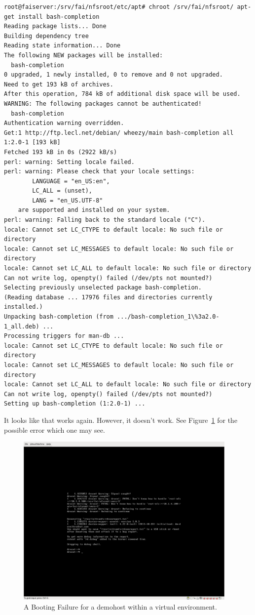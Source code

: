 \documentclass[11pt
  , a4paper
  , article
  , oneside
]{memoir}
\begin{document}
\begin{lstlisting}
root@faiserver:/srv/fai/nfsroot/etc/apt# chroot /srv/fai/nfsroot/ apt-get install bash-completion
Reading package lists... Done
Building dependency tree       
Reading state information... Done
The following NEW packages will be installed:
  bash-completion
0 upgraded, 1 newly installed, 0 to remove and 0 not upgraded.
Need to get 193 kB of archives.
After this operation, 784 kB of additional disk space will be used.
WARNING: The following packages cannot be authenticated!
  bash-completion
Authentication warning overridden.
Get:1 http://ftp.lecl.net/debian/ wheezy/main bash-completion all 1:2.0-1 [193 kB]
Fetched 193 kB in 0s (2922 kB/s)        
perl: warning: Setting locale failed.
perl: warning: Please check that your locale settings:
        LANGUAGE = "en_US:en",
        LC_ALL = (unset),
        LANG = "en_US.UTF-8"
    are supported and installed on your system.
perl: warning: Falling back to the standard locale ("C").
locale: Cannot set LC_CTYPE to default locale: No such file or directory
locale: Cannot set LC_MESSAGES to default locale: No such file or directory
locale: Cannot set LC_ALL to default locale: No such file or directory
Can not write log, openpty() failed (/dev/pts not mounted?)
Selecting previously unselected package bash-completion.
(Reading database ... 17976 files and directories currently installed.)
Unpacking bash-completion (from .../bash-completion_1\%3a2.0-1_all.deb) ...
Processing triggers for man-db ...
locale: Cannot set LC_CTYPE to default locale: No such file or directory
locale: Cannot set LC_MESSAGES to default locale: No such file or directory
locale: Cannot set LC_ALL to default locale: No such file or directory
Can not write log, openpty() failed (/dev/pts not mounted?)
Setting up bash-completion (1:2.0-1) ...
\end{lstlisting}

It looks like that works again. However, it doesn't work. See Figure~\ref{fig:fai-error} for the possible error which one may see.

\begin{figure}[!htb]
  \centering
  \includegraphics[width=0.96\textwidth]{./images/fai-error.eps}
  \caption{
            A Booting Failure for a demohost within a virtual environment.
          }
  \label{fig:fai-error}   
\end{figure}
\end{document}

